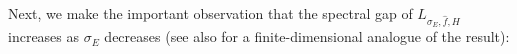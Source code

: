 \documentclass[11pt]{amsart}
\newcommand{\1}{\mathbbm{1}}
\theoremstyle{plain}
\newtheorem{proposition}[theorem]{Proposition}
\theoremstyle{definition}
\theoremstyle{remark}
\numberwithin{equation}{section}
\begin{document}



\noindent Next, we make the important observation that the spectral gap of $L_{\sigma_E,\widehat{f},H}$ increases as $\sigma_E$ decreases (see also \cite{slezak2026polynomial} for a finite-dimensional analogue of the result):
\end{document}
